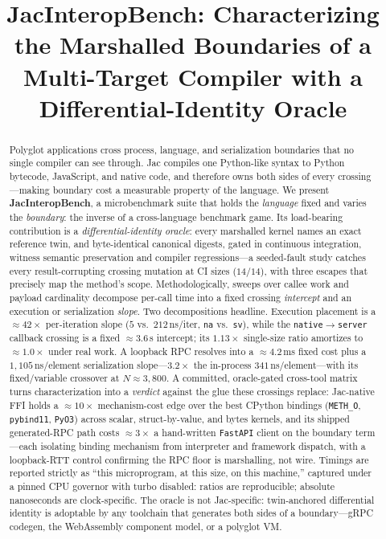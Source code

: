 \documentclass[conference]{IEEEtran}
\newcommand{\code}[1]{\texttt{#1}}
\begin{document}
\title{JacInteropBench: Characterizing the Marshalled Boundaries of a
Multi-Target Compiler with a Differential-Identity Oracle}

\author{
}

\maketitle

\begin{abstract}
Polyglot applications cross process, language, and serialization boundaries
that no single compiler can see through. Jac compiles one Python-like syntax to
Python bytecode, JavaScript, and native code, and therefore owns both sides of
every crossing---making boundary cost a measurable property of the language. We
present \textbf{JacInteropBench}, a microbenchmark suite that holds the
\emph{language} fixed and varies the \emph{boundary}: the inverse of a
cross-language benchmark game. Its load-bearing contribution is a
\emph{differential-identity oracle}: every marshalled kernel names an exact
reference twin, and byte-identical canonical digests, gated in continuous
integration, witness semantic preservation and compiler regressions---a
seeded-fault study catches every result-corrupting crossing mutation at CI sizes
($14/14$), with three escapes that precisely map the method's scope.
Methodologically, sweeps over callee work and payload cardinality decompose
per-call time into a fixed crossing \emph{intercept} and an execution or
serialization \emph{slope}. Two decompositions headline. Execution placement is
a $\approx$$42\times$ per-iteration slope ($5$ vs.\ $212$\,ns/iter, \code{na}
vs.\ \code{sv}), while the \code{native$\rightarrow$server} callback crossing
is a fixed $\approx$$3.6$\,\textmu s intercept; its $1.13\times$ single-size
ratio amortizes to $\approx$$1.0\times$ under real work. A loopback RPC
resolves into a $\approx$$4.2$\,ms fixed cost plus a $1{,}105$\,ns/element
serialization slope---$3.2\times$ the in-process $341$\,ns/element---with
its fixed/variable crossover at $N\approx3{,}800$. A committed, oracle-gated cross-tool matrix
turns characterization into a \emph{verdict} against the glue these crossings
replace: Jac-native FFI holds a $\approx$$10\times$ mechanism-cost edge over the
best CPython bindings (\code{METH\_O}, \code{pybind11}, \code{PyO3}) across
scalar, struct-by-value, and bytes kernels, and its shipped generated-RPC path
costs $\approx$$3\times$ a hand-written \code{FastAPI} client on the boundary
term---each isolating binding mechanism from interpreter and framework dispatch,
with a loopback-RTT control confirming the RPC floor is marshalling, not wire.
Timings are reported strictly as ``this
microprogram, at this size, on this machine,'' captured under a pinned CPU
governor with turbo disabled: ratios are reproducible; absolute nanoseconds are
clock-specific. The oracle is not Jac-specific: twin-anchored differential
identity is adoptable by any toolchain that generates both sides of a
boundary---gRPC codegen, the WebAssembly component model, or a polyglot VM.
\end{abstract}
\end{document}
